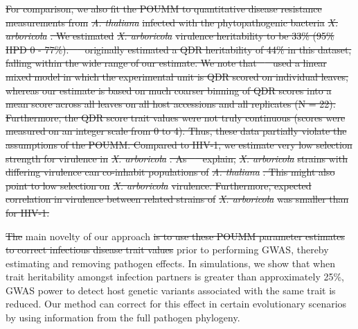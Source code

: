 \documentclass[12pt]{article} %
\providecommand{\DIFadd}[1]{{\protect\color{blue}\uwave{#1}}} %
\providecommand{\DIFdel}[1]{{\protect\color{red}\sout{#1}}}                      %
\providecommand{\DIFaddbegin}{} %
\providecommand{\DIFaddend}{} %
\providecommand{\DIFdelbegin}{} %
\providecommand{\DIFdelend}{} %
\newcommand{\DIFscaledelfig}{0.5}
\newlength{\DIFdelgraphicswidth} %
\newlength{\DIFdelgraphicsheight} %
\newcommand{\DIFaddincludegraphics}[2][]{{\color{blue}\fbox{\DIFOincludegraphics[#1]{#2}}}} %
\newcommand{\DIFdelincludegraphics}[2][]{%
\sbox{\DIFdelgraphicsbox}{\DIFOincludegraphics[#1]{#2}}%
\settoboxwidth{\DIFdelgraphicswidth}{\DIFdelgraphicsbox} %
\settoboxtotalheight{\DIFdelgraphicsheight}{\DIFdelgraphicsbox} %
\scalebox{\DIFscaledelfig}{%
\parbox[b]{\DIFdelgraphicswidth}{\usebox{\DIFdelgraphicsbox}\\[-\baselineskip] \rule{\DIFdelgraphicswidth}{0em}}\llap{\resizebox{\DIFdelgraphicswidth}{\DIFdelgraphicsheight}{%
\setlength{\unitlength}{\DIFdelgraphicswidth}%
\begin{picture}(1,1)%
\thicklines\linethickness{2pt} %
{\color[rgb]{1,0,0}\put(0,0){\framebox(1,1){}}}%
{\color[rgb]{1,0,0}\put(0,0){\line( 1,1){1}}}%
{\color[rgb]{1,0,0}\put(0,1){\line(1,-1){1}}}%
\end{picture}%
}\hspace*{3pt}}} %
} %
\DeclareRobustCommand{\DIFaddbegin}{\DIFOaddbegin \let\includegraphics\DIFaddincludegraphics} %
\DeclareRobustCommand{\DIFaddend}{\DIFOaddend \let\includegraphics\DIFOincludegraphics} %
\DeclareRobustCommand{\DIFdelbegin}{\DIFOdelbegin \let\includegraphics\DIFdelincludegraphics} %
\DeclareRobustCommand{\DIFdelend}{\DIFOaddend \let\includegraphics\DIFOincludegraphics} %
\begin{document}
\begin{doublespace}
\DIFdelbegin \DIFdel{For comparison, we also fit the POUMM to quantitative disease resistance measurements from }\emph{\DIFdel{A. thaliana}} %
\DIFdel{infected with the phytopathogenic bacteria }\emph{\DIFdel{X. arboricola}}%
\DIFdel{. We estimated }\emph{\DIFdel{X. arboricola}} %
\DIFdel{virulence heritability to be 33\% (95\% HPD 0 - 77\%). \mbox{%
\citep{Wang2018Two-wayGenomes} }\hskip0pt%
originally estimated a QDR heritability of 44\% in this dataset, falling within the wide range of our estimate. We note that \mbox{%
\cite{Wang2018Two-wayGenomes} }\hskip0pt%
used a linear mixed model in which the experimental unit is QDR scored on individual leaves, whereas our estimate is based on much coarser binning of QDR scores into a mean score across all leaves on all host accessions and all replicates (N = 22). Furthermore, the QDR score trait values were not truly continuous (scores were measured on an integer scale from 0 to 4). Thus, these data partially violate the assumptions of the POUMM. Compared to HIV-1, we estimate very low selection strength for virulence in }\emph{\DIFdel{X. arboricola}}%
\DIFdel{. As \mbox{%
\cite{Wang2018Two-wayGenomes} }\hskip0pt%
explain, }\emph{\DIFdel{X. arboricola}} %
\DIFdel{strains with differing virulence can co-inhabit populations of }\emph{\DIFdel{A. thaliana}}%
\DIFdel{. This might also point to low selection on }\emph{\DIFdel{X. arboricola}} %
\DIFdel{virulence. Furthermore, expected correlation in virulence between related strains of }\emph{\DIFdel{X. arboricola}} %
\DIFdel{was smaller than for HIV-1.
}%

\DIFdel{The }\DIFdelend \DIFaddbegin \DIFadd{Instead, the }\DIFaddend main novelty of our approach \DIFdelbegin \DIFdel{is to use these POUMM parameter estimates to correct infectious disease trait values }\DIFdelend \DIFaddbegin \DIFadd{was to correct the spVL trait }\DIFaddend prior to performing \DIFaddbegin \DIFadd{the }\DIFaddend GWAS, thereby estimating and removing pathogen effects. In simulations, we show that when trait heritability amongst infection partners is greater than approximately 25\%, GWAS power to detect host genetic variants associated with the same trait is reduced. Our method can correct for this effect in certain evolutionary scenarios by using information from the full pathogen phylogeny. 
\DIFaddbegin 


\end{doublespace}
\end{document}
